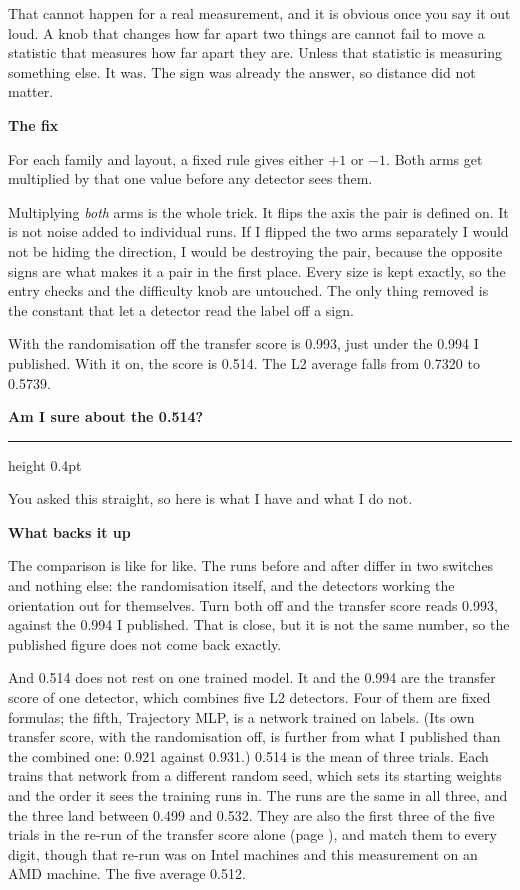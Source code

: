 \documentclass[11pt,a4paper]{article}
\newcommand{\heading}[1]{%
  \par\vspace{1.5em}%
  \phantomsection\addcontentsline{toc}{section}{#1}%
  {\sffamily\bfseries\large #1}%
  \par\vspace{0.15em}%
  \hrule height 0.4pt%
  \par\vspace{0.5em}%
}
\newcommand{\subhead}[1]{%
  \par\vspace{0.9em}%
  {\sffamily\bfseries #1}%
  \par\vspace{0.15em}%
}
\begin{document}
That cannot happen for a real measurement, and it is obvious once you say it out
loud. A knob that changes how far apart two things are cannot fail to move a
statistic that measures how far apart they are. Unless that statistic is measuring
something else. It was. The sign was already the answer, so distance did not
matter.

\subhead{The fix}
For each family and layout, a fixed rule gives either $+1$ or $-1$. Both arms get
multiplied by that one value before any detector sees them.

Multiplying \emph{both} arms is the whole trick. It flips the axis the pair is
defined on. It is not noise added to individual runs. If I flipped the two arms
separately I would not be hiding the direction, I would be destroying the pair,
because the opposite signs are what makes it a pair in the first place. Every size
is kept exactly, so the entry checks and the difficulty knob are untouched. The
only thing removed is the constant that let a detector read the label off a sign.

With the randomisation off the transfer score is 0.993, just under the 0.994 I
published. With it on, the score is 0.514. The L2 average falls from 0.7320 to
0.5739.

\heading{Am I sure about the 0.514?}
\label{h:sure}

You asked this straight, so here is what I have and what I do not.

\subhead{What backs it up}
The comparison is like for like. The runs before and after differ in two switches and
nothing else: the randomisation itself, and the detectors working the orientation out
for themselves. Turn both off and the transfer score reads 0.993, against the 0.994 I
published. That is close,
but it is not the same number, so the published figure does not come back exactly.

And 0.514 does not rest on one trained model. It and the 0.994 are the transfer
score of one detector, which combines five L2 detectors. Four of them are fixed
formulas; the fifth, Trajectory MLP, is a network trained on labels. (Its own
transfer score, with the randomisation off, is further from what I published than
the combined one: 0.921 against 0.931.) 0.514 is the mean of three trials. Each
trains that network from a different random seed, which sets its starting weights
and the order it sees the training runs in. The runs are the same in all three, and
the three land between 0.499 and 0.532. They are also the first three of the five
trials in the re-run of the transfer score alone (page \pageref{h:sources}), and
match them to every digit, though that re-run was on Intel machines and this
measurement on an AMD machine. The five average 0.512.
\end{document}
